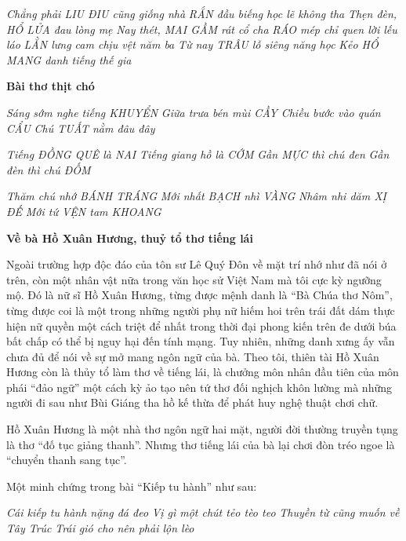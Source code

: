 \documentclass[../main.tex]{subfiles}
\begin{document}
\begin{multicols}{2}
\begin{blockquote}
\textit{Chẳng phải LIU ÐIU cũng giống nhà}        
\textit{RẮN đầu biếng học lẽ không tha}        
\textit{Thẹn đèn, HỔ LỬA đau lòng mẹ}        
\textit{Nay thét, MAI GẦM rát cổ cha}        
\textit{RÁO mép chỉ quen lời lếu láo}        
\textit{LẰN lưng cam chịu vệt năm ba}        
\textit{Từ nay TRÂU lỗ siêng năng học} 
\textit{Kẻo HỔ MANG danh tiếng thế gia} 
 
\textbf{Bài thơ thịt chó} 
        
\textit{Sáng sớm nghe tiếng KHUYỂN}        
\textit{Giữa trưa bén mùi CẦY}        
\textit{Chiều bước vào quán CẨU} 
\textit{Chú TUẤT nằm đâu đây} 
        
\textit{Tiếng ÐỒNG QUÊ là NAI}        
\textit{Tiếng giang hồ là CỚM}        
\textit{Gần MỰC thì chú đen} 
\textit{Gần đèn thì chú ÐỐM} 
        
\textit{Thăm chú nhớ BÁNH TRÁNG}        
\textit{Mới nhất BẠCH nhì VÀNG}        
\textit{Nhâm nhi dăm XỊ ÐẾ} 
\textit{Mới tứ VỆN tam KHOANG} 

\end{blockquote}
 
 
\textbf{Về bà Hồ Xuân Hương, thuỷ tổ thơ tiếng lái} 
 
Ngoài trường hợp độc đáo của tôn sư Lê Quý Ðôn về mặt trí nhớ như đã nói ở trên, còn một nhân vật nữa trong văn học sử Việt Nam mà tôi cực kỳ ngưỡng mộ. Ðó là nữ sĩ Hồ Xuân Hương, từng được mệnh danh là “Bà Chúa thơ Nôm”, từng được coi là một trong những người phụ nữ hiếm hoi trên trái đất dám thực hiện nữ quyền một cách triệt để nhất trong thời đại phong kiến trên đe dưới búa bất chấp có thể bị nguy hại đến tính mạng. Tuy nhiên, những danh xưng ấy vẫn chưa đủ để nói về sự mở mang ngôn ngữ của bà. Theo tôi, thiên tài Hồ Xuân Hương còn là thủy tổ làm thơ về tiếng lái, là chưởng môn nhân đầu tiên của môn phái “đảo ngữ” một cách kỳ ảo tạo nên tứ thơ đối nghịch khôn lường mà những người đi sau như Bùi Giáng tha hồ kế thừa để phát huy nghệ thuật chơi chữ. 
 
Hồ Xuân Hương là một nhà thơ ngôn ngữ hai mặt, người đời thường truyền tụng là thơ “đố tục giảng thanh”. Nhưng thơ tiếng lái của bà lại chơi đòn tréo ngoe là “chuyển thanh sang tục”. 
 
Một minh chứng trong bài “Kiếp tu hành” như sau: 
\begin{blockquote}
        
\textit{Cái kiếp tu hành nặng đá đeo}        
\textit{Vị gì một chút tẻo tèo teo}        
\textit{Thuyền từ cũng muốn về Tây Trúc} 
\textit{Trái gió cho nên phải lộn lèo} 


\end{blockquote}
\end{multicols}
\end{document}
